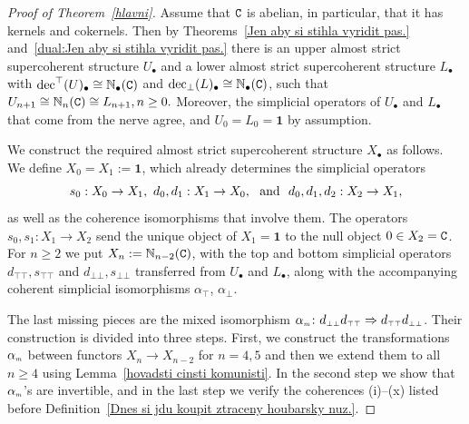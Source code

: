 \documentclass[12pt,leqno]{amsart}
\theoremstyle{definition}
\def\udec{{\rm dec}^{\top}}
\def\ldec{{\rm dec}_{\bot}}
\def\atop{\alpha_{\scriptscriptstyle\top}}
\def\abot{\alpha_{\scriptscriptstyle\bot}}
\def\amix{\alpha_{\scriptscriptstyle{\it{m}}}}
\def\dttop{d_{\scriptscriptstyle{\top\top}}}
\def\sttop{s_{\scriptscriptstyle{\top\top}}}
\def\dttop{d_{\scriptscriptstyle{\top\top}}}
\def\dbbot{d_{\scriptscriptstyle\bot\bot}}
\def\sbbot{s_{\scriptscriptstyle\bot\bot}}
\newcommand{\C}{{\tt C}}
\newcommand{\NN}{\mathbb{N}}
\newcommand{\4}{\texttt{4}}
\newcommand{\jed}{\mathbf{1}}
\begin{document}
\begin{proof}[Proof of Theorem~\ref{hlavni}] 
Assume that $\C$ is abelian, in particular, that it has kernels and
cokernels.  Then by Theorems~\ref{Jen aby si stihla vyridit pas.}
and~\ref{dual:Jen aby si stihla vyridit pas.} there is an upper almost
strict supercoherent structure $U_\bullet$ and a lower almost strict
supercoherent structure $L_\bullet$ with $\udec (U)_\bullet 
\cong \NN_\bullet(\C)$
and $\ldec (L)_\bullet \cong \NN_\bullet(\C)$, such that 
$U_{n+1}\cong \NN_n(\C)\cong L_{n+1}, n\geq 0.$ Moreover, the
simplicial operators of $U_\bullet$ and $L_\bullet$ that come
from the nerve agree, and $U_0=L_0=\jed$ by
assumption.

We construct the required almost strict 
supercoherent structure $X_\bullet$ as follows. We 
define \hbox{$X_0=X_1:=\jed$}, which already determines the simplicial
operators 
\[
s_0: X_0 \to X_1,\ d_0,d_1 : X_1 \to X_0,\
\hbox { and } \  d_0,d_1,d_2 : X_2 \to X_1,
\]
as well as the coherence isomorphisms that  involve them. The operators  
$s_0,s_1: X_1 \to X_2$ send the unique object of $X_1 = \jed$ to the
null object $0 \in X_2 = \C$.  For
\hbox{$n\geq 2$} we put $X_n:=\NN_{n-2}(\C)$, with the top and bottom
simplicial operators $\dttop, \sttop$ and $\dbbot, \sbbot$ transferred
from $U_\bullet$ and $L_\bullet$, along with the accompanying coherent
simplicial isomorphisms $\atop$, $\abot$.  

The last missing pieces are
the mixed isomorphism
$\amix\colon \dbbot\dttop\Rightarrow \dttop\dbbot$. Their construction is
divided into three steps. First, we construct the transformations
$\amix$ between functors $X_n \to X_{n-2}$ for $n=4,5$ and then
we extend them to all $n \geq 4$ using Lemma~\ref{hovadsti cinsti komunisti}.
In the second step we show that 
$\amix$'s are invertible, and in the last step  we verify the
coherences (i)--(x) listed 
before Definition~\ref{Dnes si jdu koupit ztraceny houbarsky nuz.}.


\end{proof}
\end{document}
